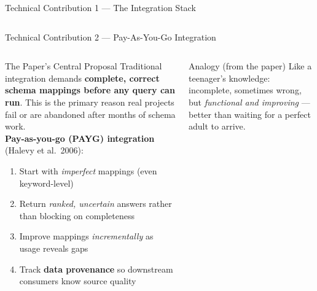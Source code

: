 \documentclass[aspectratio=169,10pt]{beamer}
\begin{document}
\begin{frame}{Technical Contribution 1 — The Integration Stack}
\begin{columns}[T]
\begin{center}
      \end{center}
  \end{columns}
\end{frame}

\begin{frame}{Technical Contribution 2 — Pay-As-You-Go Integration}
  \begin{columns}[T]
      \begin{block}{The Paper's Central Proposal}
        Traditional integration demands \textbf{complete, correct schema
        mappings before any query can run}.
        This is the primary reason real projects fail or are abandoned
        after months of schema work.\\[5pt]
        \textbf{Pay-as-you-go (PAYG) integration} (Halevy et al.\ 2006):
        \begin{enumerate}
          \item Start with \emph{imperfect} mappings (even keyword-level)
          \item Return \emph{ranked, uncertain} answers rather than blocking on completeness
          \item Improve mappings \emph{incrementally} as usage reveals gaps
          \item Track \textbf{data provenance} so downstream consumers know source quality
        \end{enumerate}
      \end{block}
      \vspace{5pt}
      \begin{exampleblock}{Analogy (from the paper)}
        Like a teenager's knowledge: incomplete, sometimes wrong, but
        \emph{functional and improving} — better than waiting for
        a perfect adult to arrive.
      \end{exampleblock}


\end{columns}
\end{frame}
\end{document}
